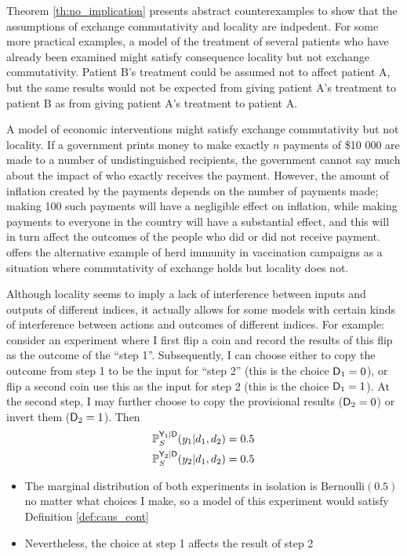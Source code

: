 Theorem \ref{th:no_implication} presents abstract counterexamples to show that the assumptions of exchange commutativity and locality are indpedent. For some more practical examples, a model of the treatment of several patients who have already been examined might satisfy consequence locality but not exchange commutativity. Patient B's treatment could be assumed not to affect patient A, but the same results would not be expected from giving patient A's treatment to patient B as from giving patient A's treatment to patient A. 

A model of economic interventions might satisfy exchange commutativity but not locality. If a government prints money to make exactly $n$ payments of \$10 000 are made to a number of undistinguished recipients, the government cannot say much about the impact of who exactly receives the payment. However, the amount of inflation created by the payments depends on the number of payments made; making 100 such payments will have a negligible effect on inflation, while making payments to everyone in the country will have a substantial effect, and this will in turn affect the outcomes of the people who did or did not receive payment. \citet{dawid_causal_2000} offers the alternative example of herd immunity in vaccination campaigns as a situation where commutativity of exchange holds but locality does not.

Although locality seems to imply a lack of interference between inputs and outputs of different indices, it actually allows for some models with certain kinds of interference between actions and outcomes of different indices. For example: consider an experiment where I first flip a coin and record the results of this flip as the outcome of the ``step 1''. Subsequently, I can choose either to copy the outcome from step 1 to be the input for ``step 2'' (this is the choice $\mathsf{D}_1=0$), or flip a second coin use this as the input for step 2 (this is the choice $\mathsf{D}_1=1$). At the second step, I may further choose to copy the provisional results ($\mathsf{D}_2=0$) or invert them ($\mathsf{D}_2=1$). Then
\begin{align}
    \mathbb{P}_S^{\mathsf{Y}_1|\mathsf{D}}(y_1|d_1,d_2) &= 0.5\\
    \mathbb{P}_S^{\mathsf{Y}_2|\mathsf{D}}(y_2|d_1,d_2) &= 0.5
\end{align}
\begin{itemize}
    \item The marginal distribution of both experiments in isolation is $\text{Bernoulli}(0.5)$ no matter what choices I make, so a model of this experiment would satisfy Definition \ref{def:caus_cont}
    \item Nevertheless, the choice at step 1 affects the result of step 2
\end{itemize}

